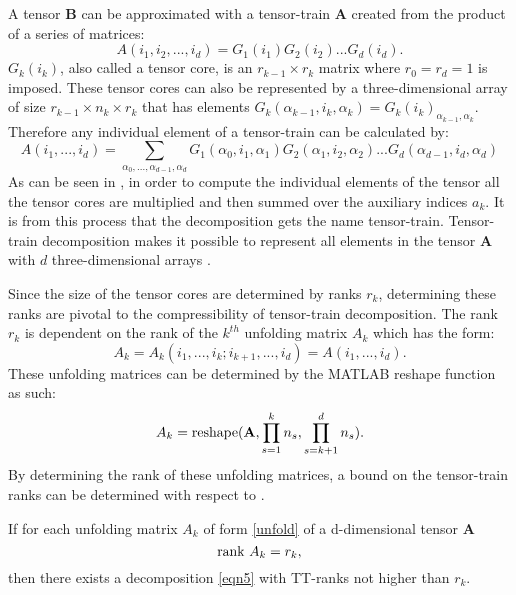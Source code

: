 A tensor \textbf{B} can be approximated with a tensor-train \textbf{A} created from the product of a series of matrices:
\begin{equation}\label{tensaprox}
A(i_1,i_2,...,i_d) = G_1(i_1)G_2(i_2)...G_d(i_d).
\end{equation}
$G_k(i_k)$, also called a tensor core, is an $r_{k-1} \times r_k$ matrix where $r_0 = r_d=1$ is imposed. These tensor cores can also be represented by a three-dimensional array of size $r_{k-1} \times n_k \times r_k$ that has elements $G_k(\alpha_{k-1},i_k,\alpha_k)= G_k(i_k)_{\alpha_{k-1},\alpha_k}$. Therefore any individual element of a tensor-train can be calculated by:
\begin{equation}\label{eqn5}
A(i_1,...,i_d) = \sum_{\alpha_0,...,\alpha_{d-1},\alpha_d}G_1(\alpha_0,i_1,\alpha_1)G_2(\alpha_1,i_2,\alpha_2)...G_d(\alpha_{d-1},i_d,\alpha_d)
\end{equation}
As can be seen in , in order to compute the individual elements of the tensor all the tensor cores are multiplied and then summed over the auxiliary indices $a_k$. It is from this process that the decomposition gets the name tensor-train. Tensor-train decomposition makes it possible to represent all elements in the tensor \textbf{A} with $d$ three-dimensional arrays \cite{Osel1}.
 
Since the size of the tensor cores are determined by ranks $r_k$, determining these ranks are pivotal to the compressibility of tensor-train decomposition. The rank $r_k$ is dependent on the rank of the $k^{th}$ unfolding matrix $A_k$ which has the form:
\begin{equation}\label{unfold}
A_k = A_k(i_1,...,i_k;i_{k+1},...,i_d) = A(i_1,...,i_d).
\end{equation}
These unfolding matrices can be determined by the MATLAB reshape function as such:
\begin{equation*}
A_k = \textnormal{reshape} (\textbf{A},\prod_{s=1}^{k}n_s,\prod_{s=k+1}^{d}n_s).
\end{equation*}
By determining the rank of these unfolding matrices, a bound on the tensor-train ranks can be determined with respect to  \cite{Osel1}.
\begin{theorem}\label{ttranks}
If for each unfolding matrix $A_k$ of form \ref{unfold} of a d-dimensional tensor \textbf{A}
\begin{equation*}
\textnormal{rank }A_k = r_k, 
\end{equation*}
then there exists a decomposition \ref{eqn5} with TT-ranks not higher than $r_k$.
\end{theorem}

